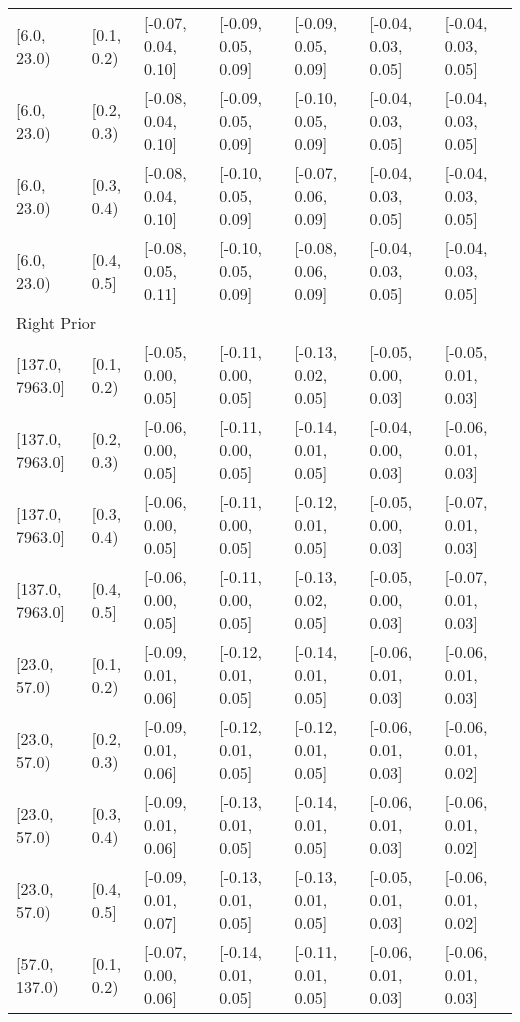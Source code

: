 \begin{table}[ht]
\begin{tabular}{lllllll}
  {[6.0, 23.0)} & {[0.1, 0.2)} & {[-0.07, 0.04, 0.10]} & {[-0.09, 0.05, 0.09]} & {[-0.09, 0.05, 0.09]} & {[-0.04, 0.03, 0.05]} & {[-0.04, 0.03, 0.05]} \\ 
  {[6.0, 23.0)} & {[0.2, 0.3)} & {[-0.08, 0.04, 0.10]} & {[-0.09, 0.05, 0.09]} & {[-0.10, 0.05, 0.09]} & {[-0.04, 0.03, 0.05]} & {[-0.04, 0.03, 0.05]} \\ 
  {[6.0, 23.0)} & {[0.3, 0.4)} & {[-0.08, 0.04, 0.10]} & {[-0.10, 0.05, 0.09]} & {[-0.07, 0.06, 0.09]} & {[-0.04, 0.03, 0.05]} & {[-0.04, 0.03, 0.05]} \\ 
  {[6.0, 23.0)} & {[0.4, 0.5]} & {[-0.08, 0.05, 0.11]} & {[-0.10, 0.05, 0.09]} & {[-0.08, 0.06, 0.09]} & {[-0.04, 0.03, 0.05]} & {[-0.04, 0.03, 0.05]} \\ 
   \midrule
\multicolumn{7}{l}{Right Prior}\\
{[137.0, 7963.0]} & {[0.1, 0.2)} & {[-0.05, 0.00, 0.05]} & {[-0.11, 0.00, 0.05]} & {[-0.13, 0.02, 0.05]} & {[-0.05, 0.00, 0.03]} & {[-0.05, 0.01, 0.03]} \\ 
  {[137.0, 7963.0]} & {[0.2, 0.3)} & {[-0.06, 0.00, 0.05]} & {[-0.11, 0.00, 0.05]} & {[-0.14, 0.01, 0.05]} & {[-0.04, 0.00, 0.03]} & {[-0.06, 0.01, 0.03]} \\ 
  {[137.0, 7963.0]} & {[0.3, 0.4)} & {[-0.06, 0.00, 0.05]} & {[-0.11, 0.00, 0.05]} & {[-0.12, 0.01, 0.05]} & {[-0.05, 0.00, 0.03]} & {[-0.07, 0.01, 0.03]} \\ 
  {[137.0, 7963.0]} & {[0.4, 0.5]} & {[-0.06, 0.00, 0.05]} & {[-0.11, 0.00, 0.05]} & {[-0.13, 0.02, 0.05]} & {[-0.05, 0.00, 0.03]} & {[-0.07, 0.01, 0.03]} \\ 
  {[23.0, 57.0)} & {[0.1, 0.2)} & {[-0.09, 0.01, 0.06]} & {[-0.12, 0.01, 0.05]} & {[-0.14, 0.01, 0.05]} & {[-0.06, 0.01, 0.03]} & {[-0.06, 0.01, 0.03]} \\ 
  {[23.0, 57.0)} & {[0.2, 0.3)} & {[-0.09, 0.01, 0.06]} & {[-0.12, 0.01, 0.05]} & {[-0.12, 0.01, 0.05]} & {[-0.06, 0.01, 0.03]} & {[-0.06, 0.01, 0.02]} \\ 
  {[23.0, 57.0)} & {[0.3, 0.4)} & {[-0.09, 0.01, 0.06]} & {[-0.13, 0.01, 0.05]} & {[-0.14, 0.01, 0.05]} & {[-0.06, 0.01, 0.03]} & {[-0.06, 0.01, 0.02]} \\ 
  {[23.0, 57.0)} & {[0.4, 0.5]} & {[-0.09, 0.01, 0.07]} & {[-0.13, 0.01, 0.05]} & {[-0.13, 0.01, 0.05]} & {[-0.05, 0.01, 0.03]} & {[-0.06, 0.01, 0.02]} \\ 
  {[57.0, 137.0)} & {[0.1, 0.2)} & {[-0.07, 0.00, 0.06]} & {[-0.14, 0.01, 0.05]} & {[-0.11, 0.01, 0.05]} & {[-0.06, 0.01, 0.03]} & {[-0.06, 0.01, 0.03]} \\ 

\end{tabular}
\end{table}
